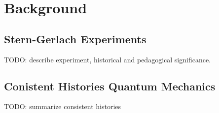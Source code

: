 \part{Background}
\chapter{Stern-Gerlach Experiments}
TODO: describe experiment, historical and pedagogical significance.
\chapter{Conistent Histories Quantum Mechanics}
TODO: summarize consistent histories
